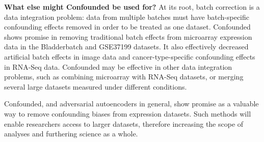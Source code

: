 \documentclass[12pt]{article}
\begin{document}
\textbf{What else might Confounded be used for?}
At its root, batch correction is a data integration problem:
data from multiple batches must have batch-specific confounding effects removed in order to be treated as one dataset.
Confounded shows promise in removing traditional batch effects from microarray expression data in the Bladderbatch and GSE37199 datasets.
It also effectively decreased artificial batch effects in image data and cancer-type-specific confounding effects in RNA-Seq data.
Confounded may be effective in other data integration problems, such as combining microarray with RNA-Seq datasets, or merging several large datasets measured under different conditions.

Confounded, and adversarial autoencoders in general, show promise as a valuable way to remove confounding biases from expression datasets.
Such methods will enable researchers access to larger datasets, therefore increasing the scope of analyses and furthering science as a whole.

\newpage
{}
{}

\end{document}

